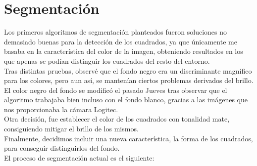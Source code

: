 \documentclass[11pt]{article}
\begin{document}
\section{Segmentación}
Los primeros algoritmos de segmentación planteados fueron soluciones no demasiado buenas para la detección de los cuadrados, ya que únicamente me basaba en la característica del color de la imagen, obteniendo resultados en los que apenas se podían distinguir los cuadrados del resto del entorno.\\
Tras distintas pruebas, observé que el fondo negro era un discriminante magnífico para los colores, pero aun así, se mantenían ciertos problemas derivados del brillo. El color negro del fondo se modificó el pasado Jueves tras observar que el algoritmo trabajaba bien incluso con el fondo blanco, gracias a las imágenes que nos proporcionaba la cámara Logitec.\\
Otra decisión, fue establecer el color de los cuadrados con tonalidad mate, consiguiendo mitigar el brillo de los mismos.\\
Finalmente, decidimos incluir una nueva característica, la forma de los cuadrados, para conseguir distinguirlos del fondo.\\
El proceso de segmentación actual es el siguiente:
\end{document}
